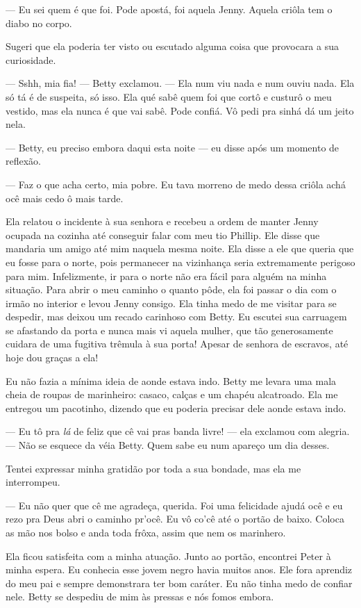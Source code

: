 --- Eu sei quem é que foi. Pode apostá, foi aquela Jenny. Aquela criôla
tem o diabo no corpo.

Sugeri que ela poderia ter visto ou escutado alguma coisa que provocara
a sua curiosidade.

--- Sshh, mia fia! --- Betty exclamou.
--- Ela num viu nada e num ouviu nada. Ela só tá é de suspeita, só isso.
Ela qué sabê quem foi que cortô e custurô o meu vestido, mas ela nunca é
que vai sabê. Pode confiá. Vô pedi pra sinhá dá um jeito nela.

--- Betty, eu preciso embora daqui esta
noite --- eu disse após um momento de reflexão.

--- Faz o que acha certo, mia pobre. Eu
tava morreno de medo dessa criôla achá ocê mais cedo ô mais tarde.

Ela relatou o incidente à sua senhora e
recebeu a ordem de manter Jenny ocupada na cozinha até conseguir falar
com meu tio Phillip. Ele disse que mandaria um amigo até mim naquela
mesma noite. Ela disse a ele que queria que eu fosse para o norte, pois
permanecer na vizinhança seria extremamente perigoso para mim.
Infelizmente, ir para o norte não era fácil para alguém na minha
situação. Para abrir o meu caminho o quanto pôde, ela foi passar o dia
com o irmão no interior e levou Jenny consigo. Ela tinha medo de me
visitar para se despedir, mas deixou um recado carinhoso com Betty. Eu
escutei sua carruagem se afastando da porta e nunca mais vi aquela
mulher, que tão generosamente cuidara de uma fugitiva trêmula à sua
porta! Apesar de senhora de escravos, até hoje dou graças a ela!

Eu não fazia a mínima ideia de aonde
estava indo. Betty me levara uma mala cheia de roupas de marinheiro:
casaco, calças e um chapéu alcatroado. Ela me entregou um pacotinho,
dizendo que eu poderia precisar dele aonde estava indo.

--- Eu tô pra \emph{lá} de feliz que cê vai pras banda livre! --- ela
exclamou com alegria. --- Não se esquece da véia Betty. Quem sabe eu num
apareço um dia desses.

Tentei expressar minha gratidão por
toda a sua bondade, mas ela me interrompeu.

--- Eu não quer que cê me agradeça, querida. Foi uma felicidade ajudá
ocê e eu rezo pra Deus abri o caminho pr'ocê. Eu vô co'cê até o portão
de baixo. Coloca as mão nos bolso e anda toda frôxa, assim que nem os
marinhero.

Ela ficou satisfeita com a minha
atuação. Junto ao portão, encontrei Peter à minha espera. Eu conhecia
esse jovem negro havia muitos anos. Ele fora aprendiz do meu pai e
sempre demonstrara ter bom caráter. Eu não tinha medo de confiar nele.
Betty se despediu de mim às pressas e nós fomos embora.

